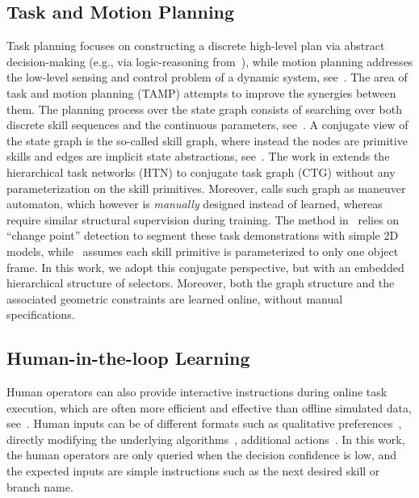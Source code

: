 \subsection{Task and Motion Planning}\label{sec:tamp-review}
Task planning focuses on constructing a discrete high-level plan via abstract decision-making (e.g., via logic-reasoning from~\cite{fox2003pddl2}), 
while motion planning addresses the low-level sensing and control problem of a dynamic system, see~\cite{lavalle2006planning}.
The area of task and motion planning (TAMP) attempts to improve the synergies between them.
The planning process over the state graph consists of searching over both discrete skill sequences and the continuous parameters, see~\cite{kaelbling2010hierarchical, konidaris2018skills, Toussaint18diff}.
A conjugate view of the state graph is the so-called skill graph, where instead the nodes are primitive skills and edges are implicit state abstractions, see~\cite{huang2019neural,   hayes2016autonomously,  konidaris2012robot, frazzoli2005maneuver}. 
The work in \cite{hayes2016autonomously} extends the hierarchical task networks (HTN) to conjugate task graph (CTG) without any parameterization on the skill primitives.   
Moreover, \cite{frazzoli2005maneuver} calls such graph as maneuver automaton, which however is \emph{manually} designed instead of learned, whereas~\cite{huang2019neural} require similar structural supervision during training.
The method in~\cite{konidaris2012robot} relies on ``change point'' detection to segment these task demonstrations with simple 2D models,
while~\cite{niekum2015learning} assumes each skill primitive is parameterized to only {one} object frame.
In this work, we adopt this conjugate perspective, but with an embedded hierarchical structure of selectors. 
Moreover, 
both the graph structure and the associated geometric constraints are learned online, without manual specifications. 


\subsection{Human-in-the-loop Learning}\label{sec:hil-review}
Human operators can also provide interactive instructions during online task execution, 
which are often more efficient and effective than offline simulated data,
see~\cite{xin2018accelerating, holzinger2016interactive}.
Human inputs can be of different formats such as qualitative preferences~\cite{holzinger2016interactive}, directly modifying the underlying algorithms~\cite{xin2018accelerating}, additional actions~\cite{mandel2017add}.
In this work, the human operators are only queried when the decision confidence is low, 
and the expected inputs are simple instructions such as the next desired skill or branch name. 
